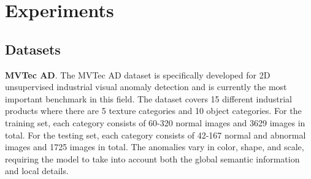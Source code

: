 \documentclass[5p, twocolumn]{elsarticle}[draft]
\begin{document}
\begin{table}[]
\centering
\footnotesize
\caption{Comparison of pixel-level detection results on the MVTec 3D-AD dataset(AUPRO\%). The results of baselines are from \cite{zheng2022benchmarking}}
\label{Table6}
\end{table}


\section{Experiments}
\subsection{Datasets}
\label{4.1}
\textbf{MVTec AD}. The MVTec AD dataset \cite{bergmann2019mvtec} is specifically developed for 2D unsupervised industrial visual anomaly detection and is currently the most important benchmark in this field. The dataset covers 15 different industrial products where there are 5 texture categories and 10 object categories. For the training set, each category consists of 60-320 normal images and 3629 images in total. For the testing set, each category consists of 42-167 normal and abnormal images and 1725 images in total. The anomalies vary in color, shape, and scale, requiring the model to take into account both the global semantic information and local details.
\end{document}
